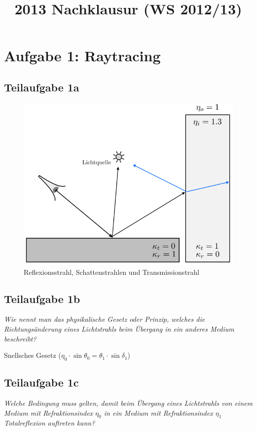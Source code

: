 \documentclass[a4paper]{scrartcl}
\begin{document}
\title{2013 Nachklausur (WS 2012/13)}

\setcounter{section}{1}
\section*{Aufgabe 1: Raytracing}
\subsection*{Teilaufgabe 1a}
\begin{figure}[h]
    \centering
    \includegraphics*[width=0.8\linewidth, keepaspectratio]{1a.png}
    \caption{Reflexionsstrahl, Schattenstrahlen und Transmissionstrahl}
    \label{fig:1a}
\end{figure}

\subsection*{Teilaufgabe 1b}
\textit{Wie nennt man das physikalische Gesetz oder Prinzip, welches die Richtungsänderung
eines Lichtstrahls beim Übergang in ein anderes Medium beschreibt?}

Snellsches Gesetz ($\eta_0 \cdot \sin \theta_0 = \theta_1 \cdot \sin \delta_1$)

\subsection*{Teilaufgabe 1c}
\textit{Welche Bedingung muss gelten, damit beim Übergang eines Lichtstrahls
von einem Medium mit Refraktionsindex $\eta_0$ in ein Medium mit
Refraktionsindex $\eta_1$ Totalreflexion auftreten kann?}
\end{document}
